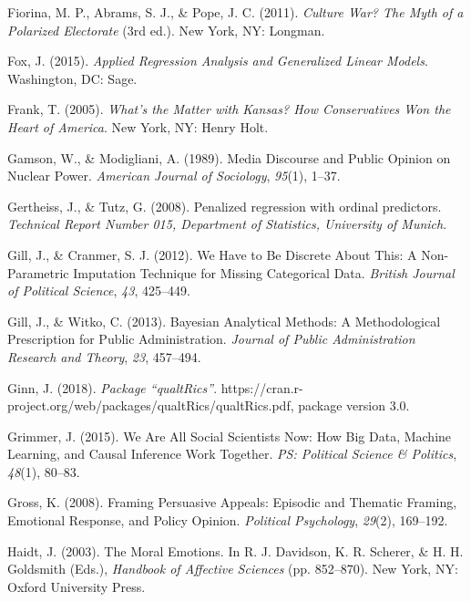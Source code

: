 \documentclass[12pt,econ]{sources/authesis}
\begin{document}
\leavevmode\hypertarget{ref-fiorina_culture_2011}{}%
Fiorina, M. P., Abrams, S. J., \& Pope, J. C. (2011). \emph{Culture War? The Myth of a Polarized Electorate} (3rd ed.). New York, NY: Longman.

\leavevmode\hypertarget{ref-fox_applied_2015}{}%
Fox, J. (2015). \emph{Applied Regression Analysis and Generalized Linear Models}. Washington, DC: Sage.

\leavevmode\hypertarget{ref-frank_whats_2005}{}%
Frank, T. (2005). \emph{What's the Matter with Kansas? How Conservatives Won the Heart of America}. New York, NY: Henry Holt.

\leavevmode\hypertarget{ref-gamson_media_1989}{}%
Gamson, W., \& Modigliani, A. (1989). Media Discourse and Public Opinion on Nuclear Power. \emph{American Journal of Sociology}, \emph{95}(1), 1--37.

\leavevmode\hypertarget{ref-gertheiss_2008_penalized}{}%
Gertheiss, J., \& Tutz, G. (2008). Penalized regression with ordinal predictors. \emph{Technical Report Number 015, Department of Statistics, University of Munich}.

\leavevmode\hypertarget{ref-gill_2012_have}{}%
Gill, J., \& Cranmer, S. J. (2012). We Have to Be Discrete About This: A Non-Parametric Imputation Technique for Missing Categorical Data. \emph{British Journal of Political Science}, \emph{43}, 425--449.

\leavevmode\hypertarget{ref-gill_2013_bayesian}{}%
Gill, J., \& Witko, C. (2013). Bayesian Analytical Methods: A Methodological Prescription for Public Administration. \emph{Journal of Public Administration Research and Theory}, \emph{23}, 457--494.

\leavevmode\hypertarget{ref-ginn_2018_package}{}%
Ginn, J. (2018). \emph{Package ``qualtRics''}. https://cran.r-project.org/web/packages/qualtRics/qualtRics.pdf, package version 3.0.

\leavevmode\hypertarget{ref-grimmer_2015_social}{}%
Grimmer, J. (2015). We Are All Social Scientists Now: How Big Data, Machine Learning, and Causal Inference Work Together. \emph{PS: Political Science \& Politics}, \emph{48}(1), 80--83.

\leavevmode\hypertarget{ref-gross_framing_2008}{}%
Gross, K. (2008). Framing Persuasive Appeals: Episodic and Thematic Framing, Emotional Response, and Policy Opinion. \emph{Political Psychology}, \emph{29}(2), 169--192.

\leavevmode\hypertarget{ref-haidt_moral_2003}{}%
Haidt, J. (2003). The Moral Emotions. In R. J. Davidson, K. R. Scherer, \& H. H. Goldsmith (Eds.), \emph{Handbook of Affective Sciences} (pp. 852--870). New York, NY: Oxford University Press.
\end{document}
